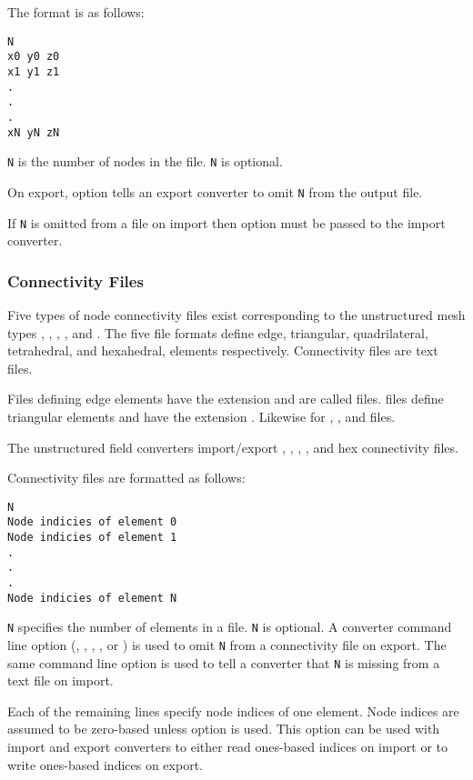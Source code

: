The format is as follows:

\begin{verbatim}
N
x0 y0 z0
x1 y1 z1
.
.
.
xN yN zN
\end{verbatim}

\verb|N| is the number of nodes in the file.  \verb|N| is optional.

On export, option  tells an export converter to
omit \verb|N| from the output file.

If \verb|N| is omitted from a file on import then option
 must be passed to the import converter.


\subsubsection{Connectivity Files}
\label{sec:node_conn_fmt}

Five types of node connectivity files exist corresponding to the
unstructured mesh types , ,
, , and
.  The five file formats define
edge, triangular, quadrilateral, tetrahedral, and hexahedral,
elements respectively.  Connectivity files are text files.

Files defining edge elements have the extension  and
are called  files.   files define triangular
elements and have the extension .  Likewise for
, , and  files.

The unstructured field converters import/export ,
, , , and hex connectivity
files.

Connectivity files are formatted as follows:

\begin{verbatim}
N
Node indicies of element 0
Node indicies of element 1
.
.
.
Node indicies of element N
\end{verbatim}

\verb|N| specifies the number of elements in a file.  \verb|N| is
optional.  A converter command line option (,
, , ,
  or ) is used to omit \verb|N|
from a connectivity file on export.  The same command line option
is used to tell a converter that \verb|N| is missing from a text file
on import.

Each of the remaining lines specify node indices of one element.
Node indices are assumed to be zero-based unless option
 is used.  This option can be used with
import and export converters to either read ones-based indices on
import or to write ones-based indices on export.

